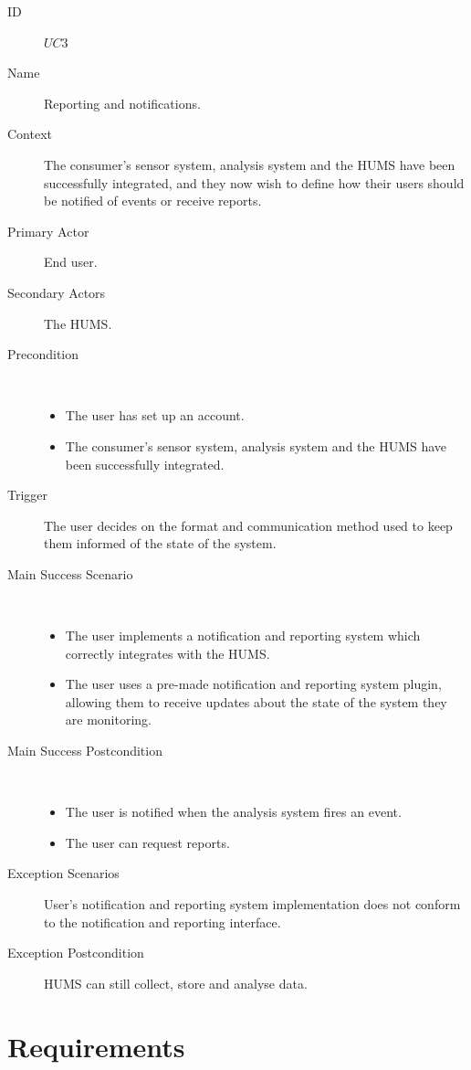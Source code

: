 \documentclass[10pt,a4paper]{article}
\begin{document}
\begin{description}
	\item[ID] $UC3$
	\item[Name] Reporting and notifications.
	\item[Context] The consumer's sensor system, analysis system and the HUMS
	               have been successfully integrated, and they now wish to define
	               how their users should be notified of events or receive reports.
	\item[Primary Actor] End user.
	\item[Secondary Actors] The HUMS.
	\item[Precondition] ~
			\begin{itemize}
			\item The user has set up an account.
			\item The consumer's sensor system, analysis system and the HUMS have
			      been successfully integrated.
			\end{itemize}
	\item[Trigger] The user decides on the format and communication method used
	               to keep them informed of the state of the system.
	\item[Main Success Scenario] ~
			\begin{itemize}
				\item The user implements a notification and reporting system which
				      correctly integrates with the HUMS.
				\item The user uses a pre-made notification and reporting system plugin,
				 allowing them to receive updates about the state of the
				      system they are monitoring.
			\end{itemize}
	\item[Main Success Postcondition] ~
			\begin{itemize}
				\item The user is notified when the analysis system fires an event.
				\item The user can request reports.
			\end{itemize}
	\item[Exception Scenarios] User's notification and reporting system
			implementation does not conform to the notification and reporting
			interface.
	\item[Exception Postcondition] HUMS can still collect, store and analyse data.
\end{description}


\section{Requirements}
\end{document}
